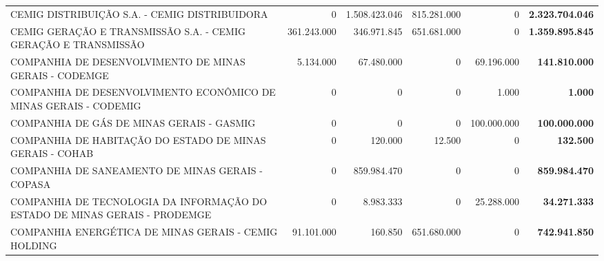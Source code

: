 \documentclass{article}
\begin{document}
\begin{longtable}[c]{m{5.5cm}|m{2.5cm}|m{2.5cm}|m{2.5cm}|m{2cm}|m{2cm}}
\multicolumn{1}{L{5.5cm}|}{CEMIG DISTRIBUIÇÃO S.A. - CEMIG DISTRIBUIDORA} & \multicolumn{1}{r|}{          0} & \multicolumn{1}{r|}{1.508.423.046} & \multicolumn{1}{r|}{815.281.000} & \multicolumn{1}{r|}{          0} & \multicolumn{1}{r}{ \textbf{2.323.704.046}} \\
\multicolumn{1}{L{5.5cm}|}{CEMIG GERAÇÃO E TRANSMISSÃO S.A. - CEMIG GERAÇÃO E TRANSMISSÃO} & \multicolumn{1}{r|}{361.243.000} & \multicolumn{1}{r|}{346.971.845} & \multicolumn{1}{r|}{651.681.000} & \multicolumn{1}{r|}{          0} & \multicolumn{1}{r}{ \textbf{1.359.895.845}} \\
\multicolumn{1}{L{5.5cm}|}{COMPANHIA DE DESENVOLVIMENTO DE MINAS GERAIS - CODEMGE} & \multicolumn{1}{r|}{5.134.000} & \multicolumn{1}{r|}{67.480.000} & \multicolumn{1}{r|}{            0} & \multicolumn{1}{r|}{69.196.000} & \multicolumn{1}{r}{ \textbf{141.810.000}} \\
\multicolumn{1}{L{5.5cm}|}{COMPANHIA DE DESENVOLVIMENTO ECONÔMICO DE MINAS GERAIS - CODEMIG} & \multicolumn{1}{r|}{          0} & \multicolumn{1}{r|}{            0} & \multicolumn{1}{r|}{            0} & \multicolumn{1}{r|}{1.000} & \multicolumn{1}{r}{ \textbf{1.000}} \\
\multicolumn{1}{L{5.5cm}|}{COMPANHIA DE GÁS DE MINAS GERAIS - GASMIG} & \multicolumn{1}{r|}{          0} & \multicolumn{1}{r|}{            0} & \multicolumn{1}{r|}{            0} & \multicolumn{1}{r|}{100.000.000} & \multicolumn{1}{r}{ \textbf{100.000.000}} \\
\multicolumn{1}{L{5.5cm}|}{COMPANHIA DE HABITAÇÃO DO ESTADO DE MINAS GERAIS - COHAB} & \multicolumn{1}{r|}{          0} & \multicolumn{1}{r|}{120.000} & \multicolumn{1}{r|}{12.500} & \multicolumn{1}{r|}{          0} & \multicolumn{1}{r}{ \textbf{132.500}} \\
\multicolumn{1}{L{5.5cm}|}{COMPANHIA DE SANEAMENTO DE MINAS GERAIS - COPASA} & \multicolumn{1}{r|}{          0} & \multicolumn{1}{r|}{859.984.470} & \multicolumn{1}{r|}{            0} & \multicolumn{1}{r|}{          0} & \multicolumn{1}{r}{ \textbf{859.984.470}} \\
\multicolumn{1}{L{5.5cm}|}{COMPANHIA DE TECNOLOGIA DA INFORMAÇÃO DO ESTADO DE MINAS GERAIS - PRODEMGE} & \multicolumn{1}{r|}{          0} & \multicolumn{1}{r|}{8.983.333} & \multicolumn{1}{r|}{            0} & \multicolumn{1}{r|}{25.288.000} & \multicolumn{1}{r}{ \textbf{34.271.333}} \\
\multicolumn{1}{L{5.5cm}|}{COMPANHIA ENERGÉTICA DE MINAS GERAIS - CEMIG HOLDING} & \multicolumn{1}{r|}{91.101.000} & \multicolumn{1}{r|}{160.850} & \multicolumn{1}{r|}{651.680.000} & \multicolumn{1}{r|}{          0} & \multicolumn{1}{r}{ \textbf{742.941.850}} \\

\end{longtable}
\end{document}
